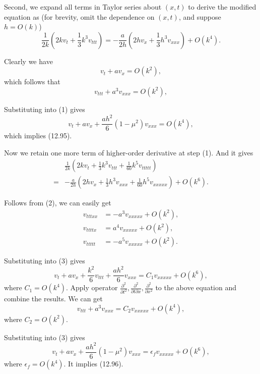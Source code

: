 \documentclass[twocolumn,10pt]{article}
\begin{document}
Second, we expand all terms in Taylor series about $(x,t)$ to derive the modified equation as (for brevity, omit the dependence on $(x,t)$, and suppose $h=O(k)$)
\begin{equation}
    \frac{1}{2k}(2kv_t+\frac{1}{3}k^3v_{ttt})=-\frac{a}{2h}(2hv_x+\frac{1}{3}h^3v_{xxx})+O(k^4).
\end{equation}

Clearly we have
\begin{equation}
    v_t+av_x=O(k^2),
\end{equation}
which follows that
\begin{equation*}
    v_{ttt}+a^3v_{xxx}=O(k^2),
\end{equation*}

Substituting into (1) gives
\begin{equation*}
    v_t+av_x+\frac{ah^2}{6}(1-\mu^2)v_{xxx}=O(k^4),
\end{equation*}
which implies (12.95).

Now we retain one more term of higher-order derivative at step (1). And it gives
\begin{align}
    &\frac{1}{2k}(2kv_t+\frac{1}{3}k^3v_{ttt}+\frac{1}{60}k^5v_{ttttt}) \nonumber \\
    =& - \frac{a}{2h}(2hv_x+\frac{1}{3}h^3v_{xxx} + \frac{1}{60}h^5v_{xxxxx}) + O(k^6).
\end{align}

Follows from (2), we can easily get
\begin{align*}
    v_{tttxx}&=-a^3v_{xxxxx}+O(k^2),\\
    v_{ttttx}&=a^4v_{xxxxx}+O(k^2),\\
    v_{ttttt}&=-a^5v_{xxxxx}+O(k^2).
\end{align*}

Substituting into (3) gives
\begin{equation*}
    v_t+av_x+\frac{k^2}{6}v_{ttt}+\frac{ah^2}{6}v_{xxx}=C_1v_{xxxxx}+O(k^6),
\end{equation*}
where $C_1=O(k^4)$. Apply operator $\frac{\partial^2}{\partial t^2},\frac{\partial^2}{\partial t\partial x},\frac{\partial^2}{\partial x^2}$ to the above equation and combine the results. We can get
\begin{equation*}
    v_{ttt}+a^3v_{xxx}=C_2v_{xxxxx}+O(k^4),
\end{equation*}
where $C_2=O(k^2)$.

Substituting into (3) gives
\begin{equation*}
    v_t+av_x+\frac{ah^2}{6}(1-\mu^2)v_{xxx}=\epsilon_f v_{xxxxx}+O(k^6),
\end{equation*}
where $\epsilon_f=O(k^4)$. It implies (12.96).
\end{document}
